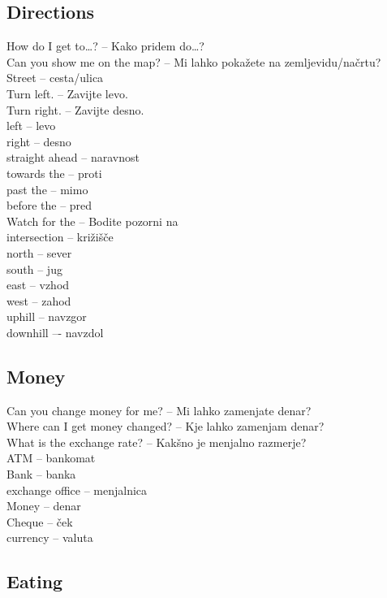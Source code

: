 \subsection{Directions}

How do I get to\ldots{}? -- Kako pridem do\ldots{}?\\
Can you show me on the map? -- Mi lahko pokažete na zemljevidu/načrtu?\\
Street -- cesta/ulica\\
Turn left. -- Zavijte levo.\\
Turn right. -- Zavijte desno.\\
left  -- levo\\
right -- desno\\
straight ahead -- naravnost\\
towards the -- proti\\
past the -- mimo\\
before the -- pred\\
Watch for the -- Bodite pozorni na\\
intersection -- križišče\\
north -- sever\\
south -- jug\\
east -- vzhod\\
west -- zahod\\
uphill -- navzgor\\
downhill –- navzdol\\

\subsection{Money}

Can you change money for me? -- Mi lahko zamenjate denar?\\
Where can I get money changed? -- Kje lahko zamenjam denar?\\
What is the exchange rate? -- Kakšno je menjalno razmerje?\\
ATM -- bankomat\\
Bank -- banka\\
exchange office -- menjalnica\\
Money -- denar\\
Cheque -- ček\\
currency -- valuta\\

\subsection{Eating}

